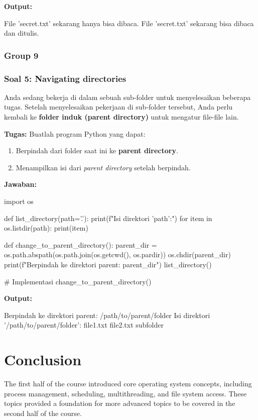 \documentclass[12pt]{article}
\begin{document}
\textbf{Output:}
\begin{python}
File 'secret.txt' sekarang hanya bisa dibaca.
File 'secret.txt' sekarang bisa dibaca dan ditulis.
\end{python}

\subsubsection{Group 9}
\subsubsection*{Soal 5: Navigating directories}
Anda sedang bekerja di dalam sebuah sub-folder untuk menyelesaikan beberapa tugas. Setelah menyelesaikan pekerjaan di sub-folder tersebut, Anda perlu kembali ke \textbf{folder induk (parent directory)} untuk mengatur file-file lain.

\textbf{Tugas:} Buatlah program Python yang dapat:
\begin{enumerate}
    \item Berpindah dari folder saat ini ke \textbf{parent directory}.
    \item Menampilkan isi dari \textit{parent directory} setelah berpindah.
\end{enumerate}

\textbf{Jawaban:}
\begin{python}
import os

def list_directory(path='.'):
    print(f"Isi direktori '{path}':")
    for item in os.listdir(path):
        print(item)

def change_to_parent_directory():
    parent_dir = os.path.abspath(os.path.join(os.getcwd(), os.pardir))
    os.chdir(parent_dir)
    print(f"Berpindah ke direktori parent: {parent_dir}")
    list_directory()

# Implementasi
change_to_parent_directory()
\end{python}

\textbf{Output:}
\begin{python}
Berpindah ke direktori parent: /path/to/parent/folder
Isi direktori '/path/to/parent/folder':
file1.txt
file2.txt
subfolder
\end{python}

\section{Conclusion}
The first half of the course introduced core operating system concepts, including process management, scheduling, multithreading, and file system access. These topics provided a foundation for more advanced topics to be covered in the second half of the course.
\end{document}
